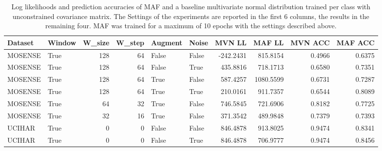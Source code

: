 \documentclass{article}
\begin{document}
\begin{landscape}
	\begin{table}
		\begin{tabularx}{18 cm}{llrrllrrrr}
			\toprule
			Dataset &  Window &  W\_size &  W\_step &  Augment &  Noise &    MVN LL &    MAF LL &  MVN ACC &  MAF ACC \\
			\midrule
			MOSENSE &    True &     128 &      64 &    False &  False & -242.2431 &  815.8154 &   0.4966 &   0.6375 \\
			MOSENSE &    True &     128 &      64 &    False &   True &  435.8816 &  718.1713 &   0.6580 &   0.7351 \\
			MOSENSE &    True &     128 &      64 &     True &  False &  587.4257 & 1080.5599 &   0.6731 &   0.7287 \\
			MOSENSE &    True &     128 &      64 &     True &   True &  210.0161 &  911.7357 &   0.6544 &   0.8089 \\
			MOSENSE &    True &      64 &      32 &     True &  False &  746.5845 &  721.6906 &   0.8182 &   0.7725 \\
			MOSENSE &    True &      32 &      16 &     True &  False &  371.3542 &  489.9848 &   0.7379 &   0.7393 \\
			UCIHAR &    True &       0 &       0 &    False &  False &  846.4878 &  913.8025 &   0.9474 &   0.8341 \\
			UCIHAR &    True &       0 &       0 &    False &   True &  846.4878 &  706.9777 &   0.9474 &   0.8456 \\
			\bottomrule
		\end{tabularx}
		\caption{\label{tab:mosense} Log likelihoods and prediction accuracies of MAF and a baseline multivariate normal distribution trained per class with unconstrained covariance matrix. The Settings of the experiments are reported in the first 6 columns, the results in the remaining four. MAF was trained for a maximum of 10 epochs with the settings described above.}
	\end{table}
\end{landscape}
\end{document}
